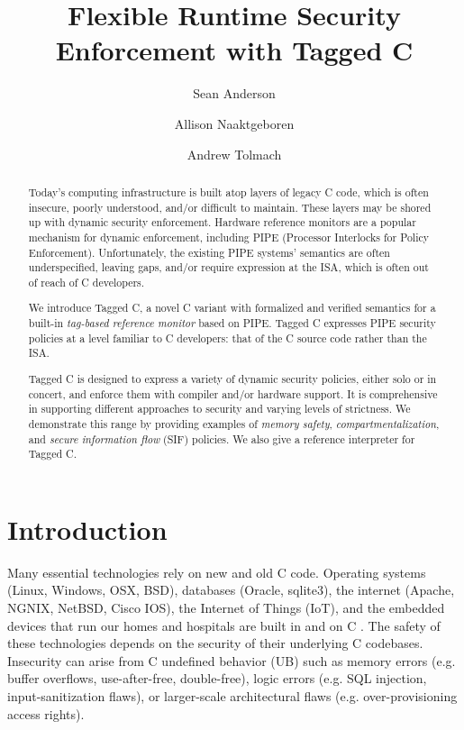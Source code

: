 \documentclass{llncs}
\title{Flexible Runtime Security Enforcement with Tagged C}
\author{Sean Anderson \and Allison Naaktgeboren \and Andrew Tolmach}
\institute{Portland State University}
\begin{document}





\maketitle

\begin{abstract}
Today's computing infrastructure is built atop layers of legacy C code, 
which is often insecure, poorly understood, and/or difficult to maintain.
These layers may be shored up with dynamic security enforcement. Hardware reference monitors 
are a popular mechanism for dynamic enforcement, including PIPE (Processor
Interlocks for Policy Enforcement). Unfortunately, the existing PIPE systems'
semantics are often underspecified, leaving gaps,
and/or require expression at the ISA, which is often out of reach of C developers.

We introduce Tagged C, a novel C variant with formalized and verified semantics 
for a built-in {\em tag-based reference monitor} based on PIPE.
Tagged C expresses PIPE security policies at a level familiar to C developers: that
of the C source code rather than the ISA.

Tagged C is designed to express a variety of dynamic security policies,  
either solo or in concert, and enforce them with compiler and/or hardware support.
It is comprehensive in supporting different
approaches to security and varying levels of strictness. We demonstrate
this range by providing examples of {\em memory safety}, {\em compartmentalization},
and {\em secure information flow} (SIF) policies. We also give a reference
interpreter for Tagged C.
\end{abstract}

\section{Introduction}
Many essential technologies rely on new and old C code.
Operating systems (Linux, Windows, OSX, BSD), databases (Oracle, sqlite3), the internet
(Apache, NGNIX, NetBSD, Cisco IOS), the Internet of Things (IoT), and the 
embedded devices that run our homes and hospitals are built in and on C \cite{Munoz:PoweredbyC}. 
The safety of these technologies
depends on the security of their underlying C codebases.
Insecurity can arise from C
undefined behavior (UB) such as memory errors (e.g. buffer overflows, use-after-free, double-free),
logic errors (e.g. SQL injection, input-sanitization flaws), or
larger-scale architectural flaws (e.g. over-provisioning access rights).
\end{document}
